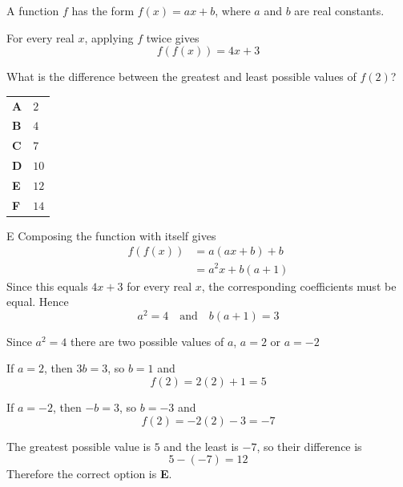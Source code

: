 \documentclass[11pt,a4paper]{article}
\begin{document}
\clearpage
\thispagestyle{djssolutions}
\vspace*{8pt}
\begin{enumerate}[label=\textbf{\arabic*.},leftmargin=*,itemsep=0pt,start=12]
A function $f$ has the form $f(x)=ax+b$, where $a$ and $b$ are real constants.

For every real $x$, applying $f$ twice gives
\[
f(f(x))=4x+3
\]

What is the difference between the greatest and least possible values of $f(2)$?

\par\vspace*{12pt}
\begin{tabularx}{\linewidth}{@{}>{\bfseries}l Y@{}}
A &
$2$
\\[0.8em]
B &
$4$
\\[0.8em]
C &
$7$
\\[0.8em]
D &
$10$
\\[0.8em]
E &
$12$
\\[0.8em]
F &
$14$
\\
\end{tabularx}

\begin{djsSolution}{E}
Composing the function with itself gives
\begin{align*}
f(f(x))&=a(ax+b)+b\\[5pt]
        &=a^2x+b(a+1)
\end{align*}
Since this equals $4x+3$ for every real $x$, the corresponding coefficients must be equal. Hence
\[
a^2=4 \quad\text{and}\quad b(a+1)=3
\]

Since \(a^2=4\) there are two possible values of $a$, $a=2$ or $a=-2$

If $a=2$, then $3b=3$, so $b=1$ and
\[
f(2)=2(2)+1=5
\]

If $a=-2$, then $-b=3$, so $b=-3$ and
\[
f(2)=-2(2)-3=-7
\]

The greatest possible value is $5$ and the least is $-7$, so their difference is
\[
5-(-7)=12
\]
Therefore the correct option is \textbf{E}.
\end{djsSolution}
\end{enumerate}
\end{document}
